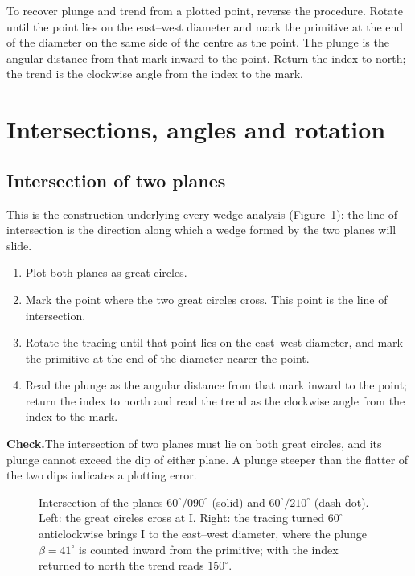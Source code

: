 To recover plunge and trend from a plotted point, reverse the procedure.
Rotate until the point lies on the east--west diameter and mark the primitive
at the end of the diameter on the same side of the centre as the point. The
plunge is the angular distance from that mark inward to the point. Return the
index to north; the trend is the clockwise angle from the index to the mark.

\section{Intersections, angles and rotation}
\label{sec:intersections-angles-and-rotation}

\subsection{Intersection of two planes}
\label{sec:construct-intersection}

This is the construction underlying every wedge analysis
(Figure~\ref{fig:construct-intersection}): the line of
intersection is the direction along which a wedge formed by the two planes
will slide.

\begin{enumerate}
  \item Plot both planes as great circles.
  \item Mark the point where the two great circles cross. This point is the
        line of intersection.
  \item Rotate the tracing until that point lies on the east--west diameter,
        and mark the primitive at the end of the diameter nearer the point.
  \item Read the plunge as the angular distance from that mark inward to
        the point; return the index to north and read the trend as the
        clockwise angle from the index to the mark.
\end{enumerate}

\noindent\textbf{Check.}\enspace The intersection of two planes must lie on
both great circles, and its plunge cannot exceed the dip of either plane. A
plunge steeper than the flatter of the two dips indicates a plotting error.

\begin{figure}[htbp]
\centering
{}
\caption{Intersection of the planes $60^\circ/090^\circ$ (solid) and $60^\circ/210^\circ$ (dash-dot). Left: the great circles cross at I. Right: the tracing turned $60^\circ$ anticlockwise brings I to the east--west diameter, where the plunge $\beta = 41^\circ$ is counted inward from the primitive; with the index returned to north the trend reads $150^\circ$.}
\label{fig:construct-intersection}
\end{figure}

